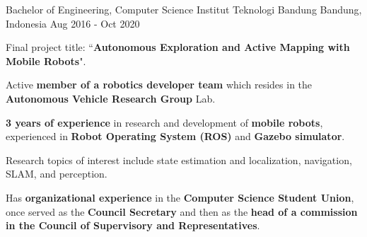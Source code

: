 

\begin{cventries}

  \cventry
    {Bachelor of Engineering, Computer Science} %
    {Institut Teknologi Bandung} %
    {Bandung, Indonesia} %
    {Aug 2016 - Oct 2020} %
    {
   	  \begin{cvitems}
		  \item {Final project title: ``\textbf{Autonomous Exploration and Active Mapping with Mobile Robots}".}
		  \item {Active \textbf{member of a robotics developer team} which resides in the \textbf{Autonomous Vehicle Research Group} Lab.}
		  \item {\textbf{3 years of experience} in research and development of \textbf{mobile robots}, experienced in \textbf{Robot Operating System (ROS)} and \textbf{Gazebo simulator}.}
          \item {Research topics of interest include state estimation and localization, navigation, SLAM, and perception.}
          \item {Has \textbf{organizational experience} in the \textbf{Computer Science Student Union}, once served as the \textbf{Council Secretary} and then as the \textbf{head of a commission in the Council of Supervisory and Representatives}.}
   	  \end{cvitems}
    }

\end{cventries}
